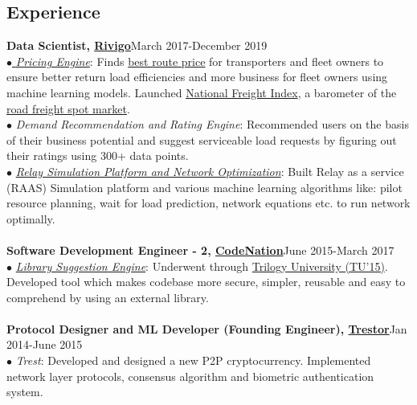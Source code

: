 \documentclass[margin,line]{resume}
\begin{document}
\begin{resume}
    \section{\mysidestyle \bf Experience}
    {\bf Data Scientist, \href{https://www.rivigo.com/}{Rivigo}}\label{sec:\mysidestyle\bfexperience}\hfill March 2017-December 2019\\
      $\bullet$\href{https://eng.rivigo.com/technology/dynamic-prediction-of-trucking-freight-prices-to-digitize-the-indian-trucking-economy/}{ \emph{ Pricing Engine}}:
    Finds \href{https://nationalfreightindex.co.in/white_paper_NFI_rivigo/}{best route price} for transporters and fleet owners to ensure better return load efficiencies and more business for fleet owners using machine learning models.
    Launched \href{https://nationalfreightindex.co.in/}{National Freight Index}, a barometer of the \href{https://www.livemint.com/companies/start-ups/start-up-rivigo-launches-national-freight-index-for-live-freight-rates-1561024666752.html}{road freight spot market}.\\
  $\bullet$ \emph{Demand Recommendation and Rating Engine}:
  Recommended users on the basis of their business potential and suggest serviceable load requests by figuring out their ratings using 300+ data points. \\
 $\bullet$ \href{https://patents.google.com/patent/US20180086348A1}{\emph{Relay Simulation Platform and Network Optimization}}:
  Built Relay as a service (RAAS) Simulation platform and various machine learning algorithms like: pilot resource planning, wait for load \linebreak prediction, network equations etc. to run network optimally.\\\\
{\bf Software Development Engineer - 2, \href{http://codenation.co.in/}{CodeNation}}\hfill June 2015-March 2017\\
	$\bullet$ \href{https://patents.google.com/patent/US10048945B1/}{\emph{Library Suggestion Engine}}: Underwent through \href{https://hbr.org/2001/04/no-ordinary-boot-camp}{Trilogy University (TU'15)}. Developed tool which makes codebase more secure, simpler, reusable and easy to comprehend by using an external library.\\\\
     {\bf Protocol Designer and ML Developer (Founding Engineer), \href{https://www.linkedin.com/company/trestor-foundation/}{Trestor}}\hfill Jan 2014-June 2015\\
	$\bullet$ \emph{Trest}: Developed and designed a new P2P cryptocurrency. Implemented network layer protocols, consensus algorithm and biometric authentication system.\\\\

\end{resume}
\end{document}
